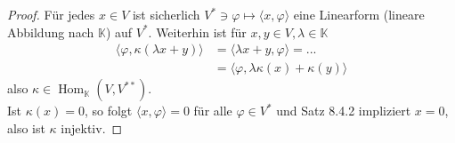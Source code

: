 \documentclass[12pt,a4paper]{article}
\theoremstyle{definition}
\theoremstyle{remark}
\DeclareMathOperator{\Hom}{Hom}
\begin{document}
	\begin{proof}
		Für jedes $x \in V$ ist sicherlich $V^* \ni \varphi \mapsto \langle x, \varphi \rangle$ eine Linearform (lineare Abbildung nach $\mathbb{K}$) auf $V^*$. Weiterhin ist für $x, y \in V, \lambda \in \mathbb{K}$
		\begin{equation}
			\begin{split}
				\langle \varphi, \kappa(\lambda x+y ) \rangle &= \langle \lambda x + y, \varphi \rangle =... \\
				&= \langle \varphi, \lambda \kappa(x) + \kappa(y) \rangle
			\end{split}
		\end{equation}
		also $\kappa \in \Hom_{\mathbb{K}}(V, V^{**})$. \\
		Ist $\kappa(x)=0$, so folgt $\langle x, \varphi \rangle =0$ für alle $\varphi \in V^*$ und Satz 8.4.2 impliziert $x=0$, also ist $\kappa$ injektiv.
	\end{proof}
\end{document}
